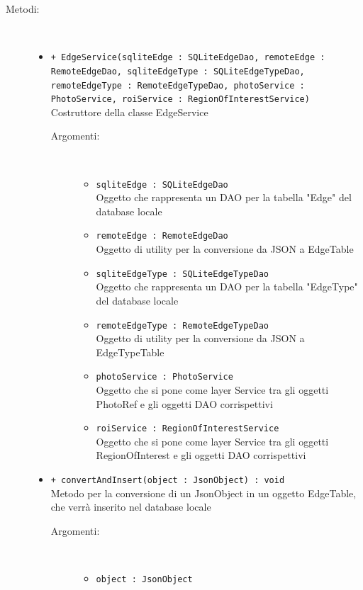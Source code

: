 \documentclass[../DefinizioneDiProdotto.tex]{subfiles}
\begin{document}
\begin{description}
\begin{itemize}
	\end{itemize}
	\item[Metodi:] \
	\begin{itemize}
		\item \texttt{+ EdgeService(sqliteEdge : SQLiteEdgeDao, remoteEdge : RemoteEdgeDao, sqliteEdgeType : SQLiteEdgeTypeDao, remoteEdgeType : RemoteEdgeTypeDao, photoService : PhotoService, roiService : RegionOfInterestService)}\\
		Costruttore della classe EdgeService
		\begin{description}
			\item[Argomenti:] \
			\begin{itemize}
				\item \texttt{sqliteEdge : SQLiteEdgeDao}\\
				Oggetto che rappresenta un DAO per la tabella "Edge" del database locale\item \texttt{remoteEdge : RemoteEdgeDao}\\
				Oggetto di utility per la conversione da JSON a EdgeTable\item \texttt{sqliteEdgeType : SQLiteEdgeTypeDao}\\
				Oggetto che rappresenta un DAO per la tabella "EdgeType" del database locale\item \texttt{remoteEdgeType : RemoteEdgeTypeDao}\\
				Oggetto di utility per la conversione da JSON a EdgeTypeTable\item \texttt{photoService : PhotoService}\\
				Oggetto che si pone come layer Service tra gli oggetti PhotoRef e gli oggetti DAO corrispettivi\item \texttt{roiService : RegionOfInterestService}\\
				Oggetto che si pone come layer Service tra gli oggetti RegionOfInterest e gli oggetti DAO corrispettivi\end{itemize}
		\end{description}
		\item \texttt{+ convertAndInsert(object : JsonObject) : void}\\
		Metodo per la conversione di un JsonObject in un oggetto EdgeTable, che verrà inserito nel database locale
		\begin{description}
			\item[Argomenti:] \
			\begin{itemize}
				\item \texttt{object : JsonObject}\\

\end{itemize}
\end{description}
\end{itemize}
\end{description}
\end{document}
